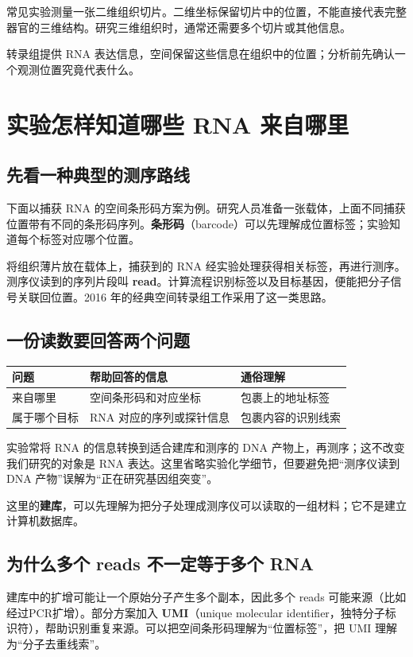 \documentclass[UTF8,a4paper,11pt,fontset=fandol]{ctexart}
\newcommand{\term}[2]{{\color{accent}\textbf{#1}}（#2）}
\newcommand{\takeaway}[1]{\begin{tcolorbox}[learningstyle,title=本章要记住]#1\end{tcolorbox}}
\newcommand{\chapterstart}[1]{\clearpage\section{#1}}
\begin{document}
常见实验测量一张二维组织切片。二维坐标保留切片中的位置，不能直接代表完整器官的三维结构。研究三维组织时，通常还需要多个切片或其他信息。

\takeaway{转录组提供 RNA 表达信息，空间保留这些信息在组织中的位置；分析前先确认一个观测位置究竟代表什么。}

\chapterstart{实验怎样知道哪些 RNA 来自哪里}
\subsection{先看一种典型的测序路线}
下面以捕获 RNA 的空间条形码方案为例。研究人员准备一张载体，上面不同捕获位置带有不同的条形码序列。\term{条形码}{barcode}可以先理解成位置标签；实验知道每个标签对应哪个位置。

将组织薄片放在载体上，捕获到的 RNA 经实验处理获得相关标签，再进行测序。测序仪读到的序列片段叫 \textbf{read}。计算流程识别标签以及目标基因，便能把分子信号关联回位置。2016 年的经典空间转录组工作采用了这一类思路。\cite{stahl2016}

\subsection{一份读数要回答两个问题}
\begin{center}
\begin{tabularx}{\linewidth}{@{}l Y Y@{}}
\toprule
{}
问题 & 帮助回答的信息 & 通俗理解 \\
\midrule
来自哪里 & 空间条形码和对应坐标 & 包裹上的地址标签 \\
属于哪个目标 & RNA 对应的序列或探针信息 & 包裹内容的识别线索 \\
\bottomrule
\end{tabularx}
\end{center}

实验常将 RNA 的信息转换到适合建库和测序的 DNA 产物上，再测序；这不改变我们研究的对象是 RNA 表达。这里省略实验化学细节，但要避免把“测序仪读到 DNA 产物”误解为“正在研究基因组突变”。\cite{nhgri-rnaseq}

这里的\textbf{建库}，可以先理解为把分子处理成测序仪可以读取的一组材料；它不是建立计算机数据库。

\subsection{为什么多个 reads 不一定等于多个 RNA}
建库中的扩增可能让一个原始分子产生多个副本，因此多个 reads 可能来源（比如经过PCR扩增）。部分方案加入 \term{UMI}{unique molecular identifier，独特分子标识符}，帮助识别重复来源。可以把空间条形码理解为“位置标签”，把 UMI 理解为“分子去重线索”。\cite{tenx-glossary}
\end{document}
